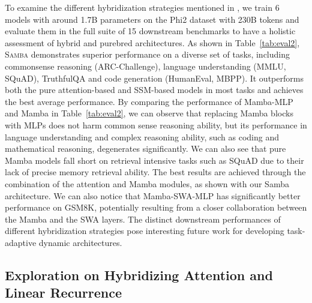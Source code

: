 \documentclass{article}
\begin{document}
To examine the different hybridization strategies mentioned in , we train 6 models with around 1.7B parameters on the Phi2 \citep{li2023textbooks} dataset with 230B tokens and evaluate them in the full suite of 15 downstream benchmarks to have a holistic assessment of hybrid and purebred architectures. As shown in Table~\ref{tab:eval2}, \textsc{Samba} demonstrates superior performance on a diverse set of tasks, including commonsense reasoning (ARC-Challenge), language understanding (MMLU, SQuAD), TruthfulQA and code generation (HumanEval, MBPP).
It outperforms both the pure attention-based and SSM-based models in most tasks and achieves the best average performance.
By comparing the performance of Mamba-MLP and Mamba in Table~\ref{tab:eval2}, we can observe that replacing Mamba blocks with MLPs does not harm common sense reasoning ability, but its performance in language understanding and complex reasoning ability, such as coding and mathematical reasoning, degenerates significantly. We can also see that pure Mamba models fall short on retrieval intensive tasks such as SQuAD due to their lack of precise memory retrieval ability. The best results are achieved through the combination of the attention and Mamba modules, as shown with our Samba architecture. We can also notice that Mamba-SWA-MLP has significantly better performance on GSM8K, potentially resulting from a closer collaboration between the Mamba and the SWA layers. The distinct downstream performances of different hybridization strategies pose interesting future work for developing task-adaptive dynamic architectures. 












\subsection{Exploration on Hybridizing Attention and Linear Recurrence} \label{linear_exp}
\end{document}
